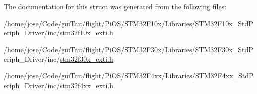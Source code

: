 The documentation for this struct was generated from the following files\-:\begin{DoxyCompactItemize}
\item 
/home/jose/\-Code/gui\-Tau/flight/\-Pi\-O\-S/\-S\-T\-M32\-F10x/\-Libraries/\-S\-T\-M32\-F10x\-\_\-\-Std\-Periph\-\_\-\-Driver/inc/\hyperlink{stm32f10x__exti_8h}{stm32f10x\-\_\-exti.\-h}\item 
/home/jose/\-Code/gui\-Tau/flight/\-Pi\-O\-S/\-S\-T\-M32\-F30x/\-Libraries/\-S\-T\-M32\-F30x\-\_\-\-Std\-Periph\-\_\-\-Driver/inc/\hyperlink{stm32f30x__exti_8h}{stm32f30x\-\_\-exti.\-h}\item 
/home/jose/\-Code/gui\-Tau/flight/\-Pi\-O\-S/\-S\-T\-M32\-F4xx/\-Libraries/\-S\-T\-M32\-F4xx\-\_\-\-Std\-Periph\-\_\-\-Driver/inc/\hyperlink{stm32f4xx__exti_8h}{stm32f4xx\-\_\-exti.\-h}\end{DoxyCompactItemize}
